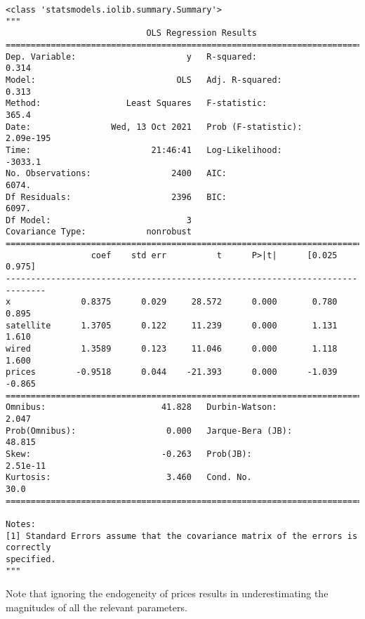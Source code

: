             \begin{tcolorbox}[breakable, size=fbox, boxrule=.5pt, pad at break*=1mm, opacityfill=0]
\begin{Verbatim}[commandchars=\\\{\}]
<class 'statsmodels.iolib.summary.Summary'>
"""
                            OLS Regression Results
==============================================================================
Dep. Variable:                      y   R-squared:                       0.314
Model:                            OLS   Adj. R-squared:                  0.313
Method:                 Least Squares   F-statistic:                     365.4
Date:                Wed, 13 Oct 2021   Prob (F-statistic):          2.09e-195
Time:                        21:46:41   Log-Likelihood:                -3033.1
No. Observations:                2400   AIC:                             6074.
Df Residuals:                    2396   BIC:                             6097.
Df Model:                           3
Covariance Type:            nonrobust
==============================================================================
                 coef    std err          t      P>|t|      [0.025      0.975]
------------------------------------------------------------------------------
x              0.8375      0.029     28.572      0.000       0.780       0.895
satellite      1.3705      0.122     11.239      0.000       1.131       1.610
wired          1.3589      0.123     11.046      0.000       1.118       1.600
prices        -0.9518      0.044    -21.393      0.000      -1.039      -0.865
==============================================================================
Omnibus:                       41.828   Durbin-Watson:                   2.047
Prob(Omnibus):                  0.000   Jarque-Bera (JB):               48.815
Skew:                          -0.263   Prob(JB):                     2.51e-11
Kurtosis:                       3.460   Cond. No.                         30.0
==============================================================================

Notes:
[1] Standard Errors assume that the covariance matrix of the errors is correctly
specified.
"""
\end{Verbatim}
\end{tcolorbox}

    Note that ignoring the endogeneity of prices results in underestimating
the magnitudes of all the relevant parameters.

